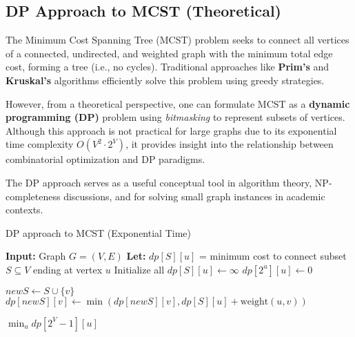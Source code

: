 \documentclass[a4paper,14pt]{extarticle}
\begin{document}
\subsection{DP Approach to MCST (Theoretical)}

The Minimum Cost Spanning Tree (MCST) problem seeks to connect all vertices of a connected, undirected, 
and weighted graph with the minimum total edge cost, forming a tree (i.e., no cycles). Traditional approaches 
like \textbf{Prim’s} and \textbf{Kruskal’s} algorithms efficiently solve this problem using greedy strategies.

However, from a theoretical perspective, one can formulate MCST as a \textbf{dynamic programming (DP)} 
problem using \textit{bitmasking} to represent subsets of vertices. Although this approach is not practical 
for large graphs due to its exponential time complexity \( O(V^2 \cdot 2^V) \), it provides insight into the 
relationship between combinatorial optimization and DP paradigms.

The DP approach serves as a useful conceptual tool in algorithm theory, NP-completeness discussions, and for 
solving small graph instances in academic contexts.

\begin{algorithm}[H]
\caption{DP approach to MCST (Exponential Time)}
\begin{algorithmic}[1]
\State \textbf{Input:} Graph \( G = (V, E) \)
\State \textbf{Let:} \( dp[S][u] \) = minimum cost to connect subset \( S \subseteq V \) ending at vertex \( u \)
\State Initialize all \( dp[S][u] \gets \infty \)
    \State \( dp[2^u][u] \gets 0 \) 
\EndFor

                \State \( newS \gets S \cup \{v\} \)
                \State \( dp[newS][v] \gets \min(dp[newS][v], dp[S][u] + \text{weight}(u,v)) \)
            \EndIf
        \EndFor
    \EndFor
\EndFor

\State \Return \( \min_{u} dp[2^V - 1][u] \)
\end{algorithmic}
\end{algorithm}
\end{document}
